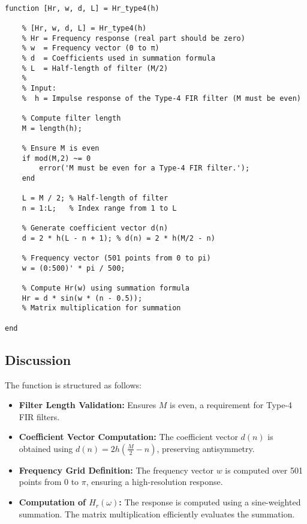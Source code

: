 \documentclass[a4paper,12pt]{article}
\begin{document}
\begin{verbatim}
    
function [Hr, w, d, L] = Hr_type4(h)

    % [Hr, w, d, L] = Hr_type4(h)
    % Hr = Frequency response (real part should be zero)
    % w  = Frequency vector (0 to π)
    % d  = Coefficients used in summation formula
    % L  = Half-length of filter (M/2)
    %
    % Input:
    %  h = Impulse response of the Type-4 FIR filter (M must be even)
    
    % Compute filter length
    M = length(h);
    
    % Ensure M is even
    if mod(M,2) ~= 0
        error('M must be even for a Type-4 FIR filter.');
    end
    
    L = M / 2; % Half-length of filter
    n = 1:L;   % Index range from 1 to L

    % Generate coefficient vector d(n)
    d = 2 * h(L - n + 1); % d(n) = 2 * h(M/2 - n)

    % Frequency vector (501 points from 0 to pi)
    w = (0:500)' * pi / 500; 

    % Compute Hr(w) using summation formula
    Hr = d * sin(w * (n - 0.5)); 
    % Matrix multiplication for summation

end
\end{verbatim}

\subsection{Discussion}

The function is structured as follows:

\begin{itemize}
    \item \textbf{Filter Length Validation:} Ensures \( M \) is even, a requirement for Type-4 FIR filters.
    
    \item \textbf{Coefficient Vector Computation:} The coefficient vector \( d(n) \) is obtained using \( d(n) = 2h\left(\frac{M}{2} - n\right) \), preserving antisymmetry.

    \item \textbf{Frequency Grid Definition:} The frequency vector \( w \) is computed over 501 points from \( 0 \) to \( \pi \), ensuring a high-resolution response.

    \item \textbf{Computation of \( H_r(\omega) \):} The response is computed using a sine-weighted summation. The matrix multiplication efficiently evaluates the summation.

\end{itemize}
\end{document}

